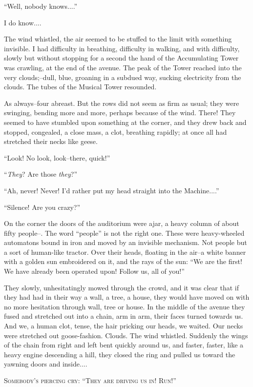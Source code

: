 \documentclass[11pt,openany]{book}
\begin{document}
``Well, nobody knows....''

I do know....

The wind whistled, the air seemed to be stuffed to the limit with something invisible. I had difficulty in breathing, difficulty in walking, and with difficulty, slowly but without stopping for a second the hand of the Accumulating Tower was crawling, at the end of the avenue. The peak of the Tower reached into the very clouds;--dull, blue, groaning in a subdued way, sucking electricity from the clouds. The tubes of the Musical Tower resounded.

As always--four abreast. But the rows did not seem as firm as usual; they were swinging, bending more and more, perhaps because of the wind. There! They seemed to have stumbled upon something at the corner, and they drew back and stopped, congealed, a close mass, a clot, breathing rapidly; at once all had stretched their necks like geese.

``Look! No look, look--there, quick!''

``\emph{They}? Are those \emph{they}?''

``Ah, never! Never! I'd rather put my head straight into the Machine....''

``Silence! Are you crazy?''

On the corner the doors of the auditorium were ajar, a heavy column of about fifty people--. The word ``people'' is not the right one. These were heavy-wheeled automatons bound in iron and moved by an invisible mechanism. Not people but a sort of human-like tractor. Over their heads, floating in the air--a white banner with a golden sun embroidered on it, and the rays of the sun: ``We are the first! We have already been operated upon! Follow us, all of you!''

They slowly, unhesitatingly mowed through the crowd, and it was clear that if they had had in their way a wall, a tree, a house, they would have moved on with no more hesitation through wall, tree or house. In the middle of the avenue they fused and stretched out into a chain, arm in arm, their faces turned towards us. And we, a human clot, tense, the hair pricking our heads, we waited. Our necks were stretched out goose-fashion. Clouds. The wind whistled. Suddenly the wings of the chain from right and left bent quickly around us, and faster, faster, like a heavy engine descending a hill, they closed the ring and pulled us toward the yawning doors and inside....

\begin{center}\textsc{Somebody's piercing cry: ``They are driving us in! Run!''}\end{center}
\end{document}
